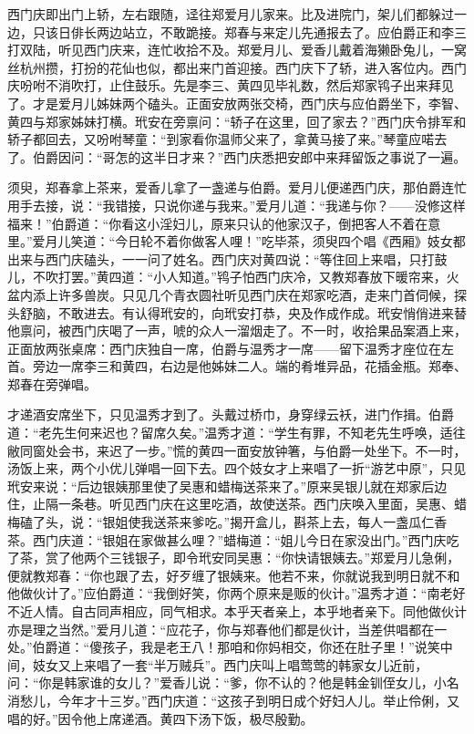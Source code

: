 西门庆即出门上轿，左右跟随，迳往郑爱月儿家来。比及进院门，架儿们都躲过一边，只该日俳长两边站立，不敢跪接。郑春与来定儿先通报去了。应伯爵正和李三打双陆，听见西门庆来，连忙收拾不及。郑爱月儿、爱香儿戴着海獭卧兔儿，一窝丝杭州攒，打扮的花仙也似，都出来门首迎接。西门庆下了轿，进入客位内。西门庆吩咐不消吹打，止住鼓乐。先是李三、黄四见毕礼数，然后郑家鸨子出来拜见了。才是爱月儿姊妹两个磕头。正面安放两张交椅，西门庆与应伯爵坐下，李智、黄四与郑家姊妹打横。玳安在旁禀问：“轿子在这里，回了家去？”西门庆令排军和轿子都回去，又吩咐琴童：“到家看你温师父来了，拿黄马接了来。”琴童应喏去了。伯爵因问：“哥怎的这半日才来？”西门庆悉把安郎中来拜留饭之事说了一遍。

须臾，郑春拿上茶来，爱香儿拿了一盏递与伯爵。爱月儿便递西门庆，那伯爵连忙用手去接，说：“我错接，只说你递与我来。”爱月儿道：“我递与你？——没修这样福来！”伯爵道：“你看这小淫妇儿，原来只认的他家汉子，倒把客人不着在意里。”爱月儿笑道：“今日轮不着你做客人哩！”吃毕茶，须臾四个唱《西厢》妓女都出来与西门庆磕头，一一问了姓名。西门庆对黄四说：“等住回上来唱，只打鼓儿，不吹打罢。”黄四道：“小人知道。”鸨子怕西门庆冷，又教郑春放下暖帘来，火盆内添上许多兽炭。只见几个青衣圆社听见西门庆在郑家吃酒，走来门首伺候，探头舒脑，不敢进去。有认得玳安的，向玳安打恭，央及作成作成。玳安悄俏进来替他禀问，被西门庆喝了一声，唬的众人一溜烟走了。不一时，收拾果品案酒上来，正面放两张桌席：西门庆独自一席，伯爵与温秀才一席——留下温秀才座位在左首。旁边一席李三和黄四，右边是他姊妹二人。端的肴堆异品，花插金瓶。郑奉、郑春在旁弹唱。

才递酒安席坐下，只见温秀才到了。头戴过桥巾，身穿绿云袄，进门作揖。伯爵道：“老先生何来迟也？留席久矣。”温秀才道：“学生有罪，不知老先生呼唤，适往敝同窗处会书，来迟了一步。”慌的黄四一面安放钟箸，与伯爵一处坐下。不一时，汤饭上来，两个小优儿弹唱一回下去。四个妓女才上来唱了一折“游艺中原”，只见玳安来说：“后边银姨那里使了吴惠和蜡梅送茶来了。”原来吴银儿就在郑家后边住，止隔一条巷。听见西门庆在这里吃酒，故使送茶。西门庆唤入里面，吴惠、蜡梅磕了头，说：“银姐使我送茶来爹吃。”揭开盒儿，斟茶上去，每人一盏瓜仁香茶。西门庆道：“银姐在家做甚么哩？”蜡梅道：“姐儿今日在家没出门。”西门庆吃了茶，赏了他两个三钱银子，即令玳安同吴惠：“你快请银姨去。”郑爱月儿急俐，便就教郑春：“你也跟了去，好歹缠了银姨来。他若不来，你就说我到明日就不和他做伙计了。”应伯爵道：“我倒好笑，你两个原来是贩的伙计。”温秀才道：“南老好不近人情。自古同声相应，同气相求。本乎天者亲上，本乎地者亲下。同他做伙计亦是理之当然。”爱月儿道：“应花子，你与郑春他们都是伙计，当差供唱都在一处。”伯爵道：“傻孩子，我是老王八！那咱和你妈相交，你还在肚子里！”说笑中间，妓女又上来唱了一套“半万贼兵”。西门庆叫上唱莺莺的韩家女儿近前，问：“你是韩家谁的女儿？”爱香儿说：“爹，你不认的？他是韩金钏侄女儿，小名消愁儿，今年才十三岁。”西门庆道：“这孩子到明日成个好妇人儿。举止伶俐，又唱的好。”因令他上席递酒。黄四下汤下饭，极尽殷勤。

